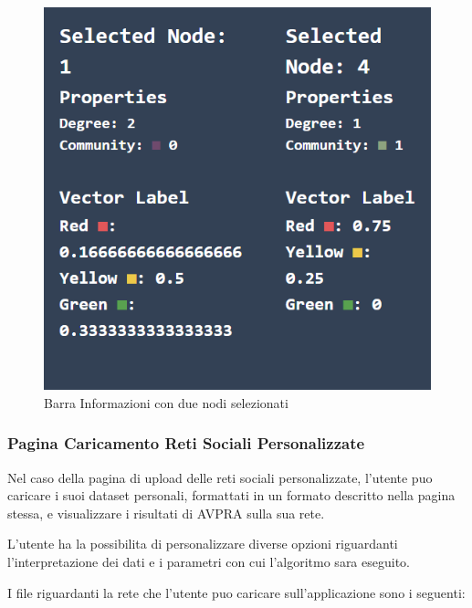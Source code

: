 \documentclass[a4paper,12pt]{report}
\begin{document}
\begin{itemize}
\begin{center}
\begin{figure}[H]
				\centering
				\includegraphics[width=0.6\linewidth]{infobar2}
				\caption{Barra Informazioni con due nodi selezionati}
				\end{figure}
			\end{center}
			\end{itemize}
			
			\subsubsection{Pagina Caricamento Reti Sociali Personalizzate}
			Nel caso della pagina di upload delle reti sociali personalizzate, l'utente puo caricare i suoi dataset personali, formattati in un formato descritto nella pagina stessa, e visualizzare i risultati di AVPRA sulla sua rete. 

			L'utente ha la possibilita di personalizzare diverse opzioni riguardanti l'interpretazione dei dati e i parametri con cui l'algoritmo sara eseguito. 

			I file riguardanti la rete che l'utente puo caricare sull'applicazione sono i seguenti:
\end{document}
